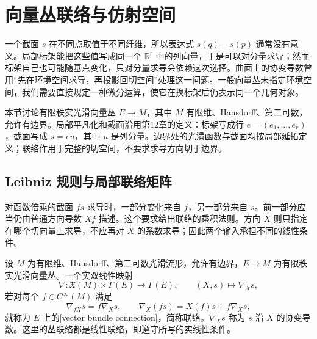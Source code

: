 
% 
% 

\section{向量丛联络与仿射空间}
\label{g1:sec:1501}

一个截面 \(s\) 在不同点取值于不同纤维，所以表达式 \(s(q)-s(p)\) 通常没有意义。局部标架能把这些值写成同一个 \(\mathbb R^r\) 中的列向量，于是可以对分量求导；然而标架自己也可能随基点变化，只对分量求导会依赖这次选择。曲面上的协变导数曾用“先在环境空间求导，再投影回切空间”处理这一问题。一般向量丛未指定环境空间，我们需要直接规定一种微分运算，使它在换标架后仍表示同一个几何对象。

\ProseParagraphBreak

本节讨论有限秩实光滑向量丛 \(E\to M\)，其中 \(M\) 有限维、Hausdorff、第二可数，允许有边界。局部平凡化和截面沿用第12章的定义：标架写成行 \(e=(e_1,\ldots,e_r)\)，截面写成 \(s=e u\)，其中 \(u\) 是列分量。边界处的光滑函数与截面均按局部延拓定义；联络作用于完整的切空间，不要求求导方向切于边界。

\subsection{Leibniz 规则与局部联络矩阵}
\label{g1:subsec:1501:01}

对函数倍乘的截面 \(fs\) 求导时，一部分变化来自 \(f\)，另一部分来自 \(s\)。前一部分应当仍由普通方向导数 \(Xf\) 描述。这个要求给出联络的乘积法则。方向 \(X\) 则只指定在哪个切向量上求导，不应再对 \(X\) 的系数求导；因此两个输入承担不同的线性条件。

\begin{definition}[丛联络]\label{g1:def:bundle-connection}
	设 \(M\) 为有限维、Hausdorff、第二可数光滑流形，允许有边界，\(E\to M\) 为有限秩实光滑向量丛。一个实双线性映射
	\[
		\nabla:\mathfrak X(M)\times\Gamma(E)\longrightarrow\Gamma(E),\qquad (X,s)\longmapsto\nabla_Xs,
	\]
	若对每个 \(f\in C^\infty(M)\) 满足
	\[
		\nabla_{fX}s=f\nabla_Xs,\qquad
		\nabla_X(fs)=X(f)s+f\nabla_Xs,
	\]
	就称为 \(E\) 上的[vector bundle connection]，简称联络。\(\nabla_Xs\) 称为 \(s\) 沿 \(X\) 的协变导数。这里的丛联络都是线性联络，即遵守所写的实线性条件。
\end{definition}

